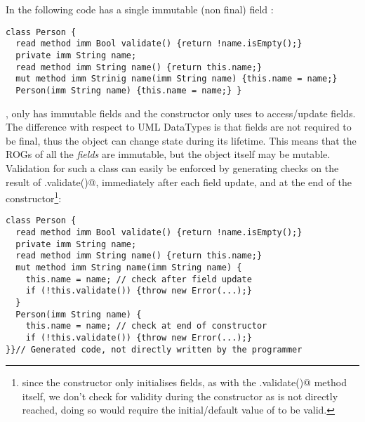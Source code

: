 In the following code \Q@Person@ has a single immutable (non final) field \Q@name@:
\begin{lstlisting}
class Person {
  read method imm Bool validate() {return !name.isEmpty();}
  private imm String name;
  read method imm String name() {return this.name;}
  mut method imm Strinig name(imm String name) {this.name = name;}
  Person(imm String name) {this.name = name;} }
\end{lstlisting}
\Q@Person@, only has immutable fields and the constructor only uses \Q@this@ to access/update fields.%
The difference with respect to UML DataTypes 
 is that fields are not required to be final, thus the object can change state during its lifetime. This means that the ROGs of all the \emph{fields} are immutable, but the object itself may be mutable.
Validation for such a class can easily be enforced by generating checks on the result of \Q@.validate()@, immediately after each field update, and at the end of the constructor\footnote{since the constructor only initialises fields, as with the \Q@.validate()@ method itself, we don't check for validity during the constructor as \Q@this@ is not directly reached, doing so would require the initial/default value of \Q@this@ to be valid.}:

\begin{lstlisting}
class Person {
  read method imm Bool validate() {return !name.isEmpty();}
  private imm String name;
  read method imm String name() {return this.name;}
  mut method imm String name(imm String name) {
    this.name = name; // check after field update
    if (!this.validate()) {throw new Error(...);} 
  }
  Person(imm String name) {
    this.name = name; // check at end of constructor
    if (!this.validate()) {throw new Error(...);}
}}// Generated code, not directly written by the programmer
\end{lstlisting}

